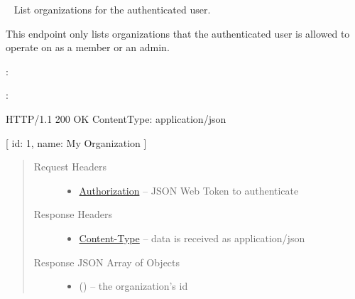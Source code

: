 \documentclass[letterpaper,10pt,english]{sphinxmanual}
\begin{document}
\begin{fulllineitems}
\label{\detokenize{resources/user:get--me-organizations}}~
List organizations for the authenticated user.

This endpoint only lists organizations that the authenticated user is
allowed to operate on as a member or an admin.

:

\begin{sphinxVerbatim}[commandchars=\\\{\}]
  
 
 
\end{sphinxVerbatim}

:

\begin{sphinxVerbatim}[commandchars=\\\{\}]
HTTP/1.1 200 OK
Content\PYGZhy{}Type: application/json

[
    \PYGZob{}
        \PYGZsq{}id\PYGZsq{}: 1,
        \PYGZsq{}name\PYGZsq{}: \PYGZsq{}My Organization\PYGZsq{}
    \PYGZcb{}
]
\end{sphinxVerbatim}
\begin{quote}\begin{description}
\item[{Request Headers}] \leavevmode\begin{itemize}
\item {} 
\href{http://tools.ietf.org/html/rfc7235\#section-4.2}{Authorization} -- JSON Web Token to authenticate

\end{itemize}

\item[{Response Headers}] \leavevmode\begin{itemize}
\item {} 
\href{http://tools.ietf.org/html/rfc7231\#section-3.1.1.5}{Content-Type} -- data is received as application/json

\end{itemize}

\item[{Response JSON Array of Objects}] \leavevmode\begin{itemize}
\item {} 
 () -- the organization's id


\end{itemize}
\end{description}
\end{quote}
\end{fulllineitems}
\end{document}
